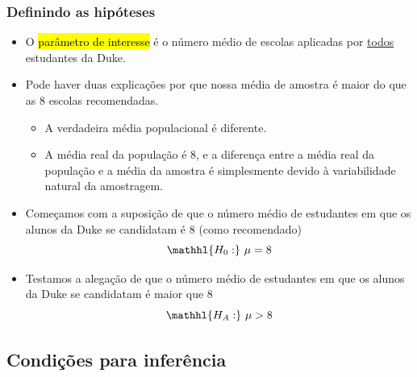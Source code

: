 \documentclass[11pt]{beamer}
\begin{document}

\begin{frame}
\frametitle{Definindo as hipóteses}

\begin{itemize}

\item O \hl{parâmetro de interesse} é o número médio de escolas aplicadas por \underline{todos} estudantes da Duke.

\pause

\item Pode haver duas explicações por que nossa média de amostra é maior do que as 8 escolas recomendadas.
\begin{itemize}
\item A verdadeira média populacional é diferente.
\item A média real da população é 8, e a diferença entre a média real da população e a média da amostra é simplesmente devido à variabilidade natural da amostragem.
\end{itemize}

\pause

\item Começamos com a suposição de que o número médio de estudantes em que os alunos da Duke se candidatam é 8 (como recomendado)
\[ \mathhl{H_0:}~\mu = 8 \]

\pause

\item Testamos a alegação de que o número médio de estudantes em que os alunos da Duke se candidatam é maior que 8
\[ \mathhl{H_A:}~\mu > 8 \]

\end{itemize}

\end{frame}


\subsection{Condições para inferência}

\end{document}
